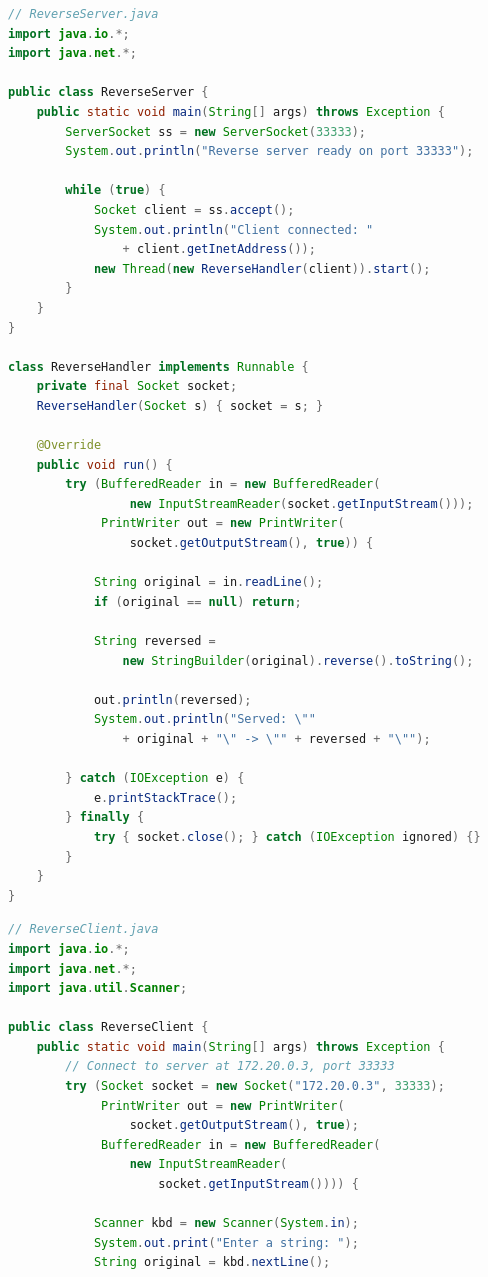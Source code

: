 \documentclass[12pt,a3paper]{article}
\begin{document}
\begin{enumerate}
\begin{tcolorbox}
\begin{lstlisting}[language=Java]
// ReverseServer.java
import java.io.*;
import java.net.*;

public class ReverseServer {
    public static void main(String[] args) throws Exception {
        ServerSocket ss = new ServerSocket(33333);
        System.out.println("Reverse server ready on port 33333");

        while (true) {
            Socket client = ss.accept();
            System.out.println("Client connected: "
                + client.getInetAddress());
            new Thread(new ReverseHandler(client)).start();
        }
    }
}

class ReverseHandler implements Runnable {
    private final Socket socket;
    ReverseHandler(Socket s) { socket = s; }

    @Override
    public void run() {
        try (BufferedReader in = new BufferedReader(
                 new InputStreamReader(socket.getInputStream()));
             PrintWriter out = new PrintWriter(
                 socket.getOutputStream(), true)) {

            String original = in.readLine();
            if (original == null) return;

            String reversed =
                new StringBuilder(original).reverse().toString();

            out.println(reversed);
            System.out.println("Served: \""
                + original + "\" -> \"" + reversed + "\"");

        } catch (IOException e) {
            e.printStackTrace();
        } finally {
            try { socket.close(); } catch (IOException ignored) {}
        }
    }
}
\end{lstlisting}

\begin{lstlisting}[language=Java]
// ReverseClient.java
import java.io.*;
import java.net.*;
import java.util.Scanner;

public class ReverseClient {
    public static void main(String[] args) throws Exception {
        // Connect to server at 172.20.0.3, port 33333
        try (Socket socket = new Socket("172.20.0.3", 33333);
             PrintWriter out = new PrintWriter(
                 socket.getOutputStream(), true);
             BufferedReader in = new BufferedReader(
                 new InputStreamReader(
                     socket.getInputStream()))) {

            Scanner kbd = new Scanner(System.in);
            System.out.print("Enter a string: ");
            String original = kbd.nextLine();


\end{lstlisting}
\end{tcolorbox}
\end{enumerate}
\end{document}
